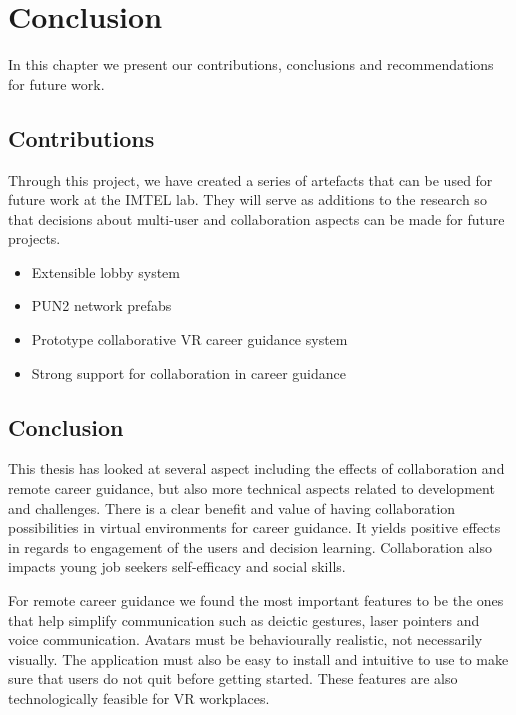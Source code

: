 
\chapter{Conclusion}
In this chapter we present our contributions, conclusions and recommendations for future work.

\section{Contributions}

Through this project, we have created a series of artefacts that can be used for future work at the IMTEL lab.  They will serve as additions to the research so that decisions about multi-user and collaboration aspects can be made for future projects.   

\begin{itemize}
    \item Extensible lobby system
    \item PUN2 network prefabs
    \item Prototype collaborative VR career guidance system
    \item Strong support for collaboration in career guidance
\end{itemize}



\section{Conclusion}
This thesis has looked at several aspect including the effects of collaboration and remote career guidance, but also more technical aspects related to development and challenges. 
There is a clear benefit and value of having collaboration possibilities in virtual environments for career guidance. It yields positive effects in regards to engagement of the users and decision learning. Collaboration also impacts young job seekers self-efficacy and social skills. 

For remote career guidance we found the most important features to be the ones that help simplify communication such as deictic gestures, laser pointers and voice communication. Avatars must be behaviourally realistic, not necessarily visually. The application must also be easy to install and intuitive to use to make sure that users do not quit before getting started. These features are also technologically feasible for VR workplaces.

